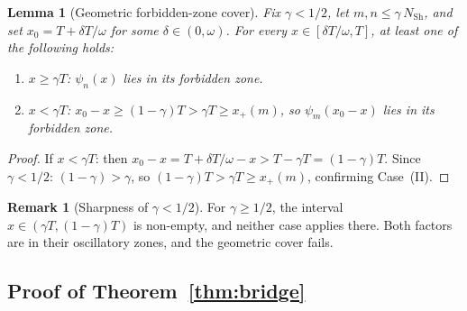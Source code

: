 \documentclass[12pt,a4paper]{article}
\newtheorem{lemma}[theorem]{Lemma}
\theoremstyle{definition}
\newtheorem{remark}[theorem]{Remark}
\newcommand{\NSh}{N_{\mathrm{Sh}}}
\begin{document}
\begin{lemma}[Geometric forbidden-zone cover]
\label{lem:bridge:cover}
Fix $\gamma < 1/2$, let $m,n \le \gamma\,\NSh$,
and set $x_0 = T + \delta T/\omega$ for some
$\delta \in (0,\omega)$.
For every $x \in [\delta T/\omega, T]$,
at least one of the following holds:
\begin{enumerate}[label=(\Roman*)]
  \item $x \ge \gamma T$:\quad
  $\psi_n(x)$ lies in its forbidden zone.
  \item $x < \gamma T$:\quad
  $x_0 - x \ge (1-\gamma)T > \gamma T \ge x_+(m)$,
  so $\psi_m(x_0-x)$ lies in its forbidden zone.
\end{enumerate}
\end{lemma}

\begin{proof}
If $x < \gamma T$: then
$x_0 - x = T + \delta T/\omega - x > T - \gamma T
= (1-\gamma)T$.
Since $\gamma < 1/2$: $(1-\gamma) > \gamma$, so
$(1-\gamma)T > \gamma T \ge x_+(m)$,
confirming Case~(II).
\end{proof}

\begin{remark}[Sharpness of $\gamma < 1/2$]
\label{rem:bridge:halfsharp}
For $\gamma \ge 1/2$, the interval
$x \in (\gamma T, (1-\gamma)T)$ is non-empty,
and neither case applies there.
Both factors are in their oscillatory zones,
and the geometric cover fails.
\end{remark}

\subsection{Proof of Theorem~\ref{thm:bridge}}
\end{document}
